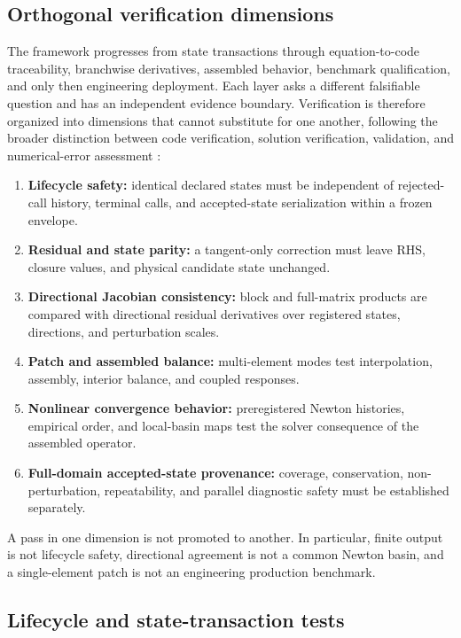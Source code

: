 \documentclass[preprint,12pt,authoryear]{elsarticle}
\begin{document}
\subsection{Orthogonal verification dimensions}

The framework progresses from state transactions through equation-to-code traceability, branchwise derivatives, assembled behavior, benchmark qualification, and only then engineering deployment. Each layer asks a different falsifiable question and has an independent evidence boundary. Verification is therefore organized into dimensions that cannot substitute for one another, following the broader distinction between code verification, solution verification, validation, and numerical-error assessment \citep{roy2005,oberkampf2010}:

\begin{enumerate}
\item \textbf{Lifecycle safety:} identical declared states must be independent of rejected-call history, terminal calls, and accepted-state serialization within a frozen envelope.
\item \textbf{Residual and state parity:} a tangent-only correction must leave RHS, closure values, and physical candidate state unchanged.
\item \textbf{Directional Jacobian consistency:} block and full-matrix products are compared with directional residual derivatives over registered states, directions, and perturbation scales.
\item \textbf{Patch and assembled balance:} multi-element modes test interpolation, assembly, interior balance, and coupled responses.
\item \textbf{Nonlinear convergence behavior:} preregistered Newton histories, empirical order, and local-basin maps test the solver consequence of the assembled operator.
\item \textbf{Full-domain accepted-state provenance:} coverage, conservation, non-perturbation, repeatability, and parallel diagnostic safety must be established separately.
\end{enumerate}

A pass in one dimension is not promoted to another. In particular, finite output is not lifecycle safety, directional agreement is not a common Newton basin, and a single-element patch is not an engineering production benchmark.

\subsection{Lifecycle and state-transaction tests}
\end{document}
